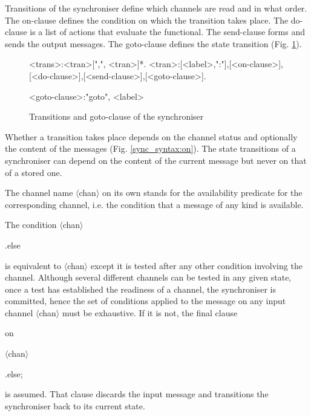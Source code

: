 Transitions of the synchroniser define which channels are read and in what order. The on-clause defines the condition on which the transition takes place. The do-clause is a list of actions that evaluate the functional. The send-clause forms and sends the output messages. The goto-clause defines the state transition (Fig. \ref{sync_syntax:trans}).

\begin{figure}[h!]
\small
\begin{grammar}
<trans>:<tran>[",", <tran>]*.
<tran>:[<label>,":"],[<on-clause>],[<do-clause>],[<send-clause>],[<goto-clause>].

<goto-clause>:"goto", <label>
\end{grammar}
\caption{Transitions and goto-clause of the synchroniser}
\label{sync_syntax:trans}
\end{figure}

Whether a transition takes place depends on the channel status and optionally the content of the messages (Fig. \ref{sync_syntax:on}). The state transitions of a synchroniser can depend on the content of the current message but never on that of a stored one.

The channel name $\langle$chan$\rangle$ on its own stands for the availability predicate for the corresponding channel, i.e. the condition that a message of any kind is available.

The condition $\langle$chan$\rangle$\begin{bf}.else\end{bf} is equivalent to $\langle$chan$\rangle$ except it is tested after any other condition involving the channel. Although several different channels can be tested in any given state, once a test has established the readiness of a channel, the synchroniser is committed, hence the set of conditions applied to the message on any input channel $\langle$chan$\rangle$ must be exhaustive. If it is not, the final clause \begin{bf}on\end{bf} $\langle$chan$\rangle$\begin{bf}.else;\end{bf} is assumed. That clause discards the input message and transitions the synchroniser back to its current state.

